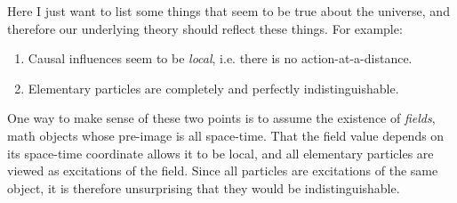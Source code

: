 Here I just want to list some things that seem to be true about the universe,
and therefore our underlying theory should reflect these things. For example:
\begin{enumerate}
  \item Causal influences seem to be {\it local}, i.e. there is no
        action-at-a-distance.
  \item Elementary particles are completely and perfectly indistinguishable.
\end{enumerate}
One way to make sense of these two points is to assume the existence of 
{\it fields}, math objects whose pre-image is all space-time.
That the field value depends on its space-time coordinate allows it to be local,
and all elementary particles are viewed as excitations of the field. Since all
particles are excitations of the same object, it is therefore unsurprising that
they would be indistinguishable.

